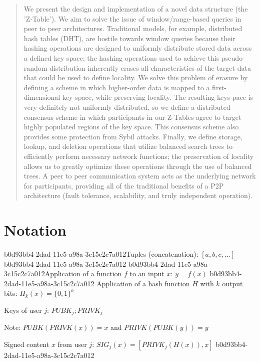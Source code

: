 \documentclass[12pt]{article}
\begin{document}
\maketitle

\begin{abstract}
We present the design and implementation of a novel data structure (the 'Z-Table'). We aim to solve the issue of window/range-based queries in peer to peer architectures. Traditional models, for example,  distributed hash tables (DHT), are hostile towards window queries because their hashing operations are designed to uniformly distribute stored data across a defined key space; the hashing operations used to achieve this pseudo-random distribution inherently erases all characteristics of the target data that could be used to define locality. We solve this problem of erasure by defining a scheme in which higher-order data is mapped to a first-dimensional key space, while preserving locality. The resulting keys pace is very definitely not uniformly distributed, so we define a distributed consensus scheme in which participants in our Z-Tables agree to target highly populated regions of the key space. This consensus scheme also provides some protection from Sybil attacks. Finally, we define storage, lookup, and deletion operations that utilize balanced search trees to efficiently perform necessary network functions; the preservation of locality allows us to greatly optimize these operations through the use of balanced trees. A peer to peer communication system acts as the underlying network for participants, providing all of the traditional benefits of a P2P architecture (fault tolerance, scalability, and truly independent operation).
\end{abstract}

\section{Notation}

b0d93bb4-2dad-11e5-a98a-3c15c2c7a012Tuples (concatenation): $[a,b,c,...]$
b0d93bb4-2dad-11e5-a98a-3c15c2c7a012
b0d93bb4-2dad-11e5-a98a-3c15c2c7a012Application of a function $f$ to an input $x$: $y=f(x)$
b0d93bb4-2dad-11e5-a98a-3c15c2c7a012
Application of a hash function $H$ with $k$ output bits: $H_{k}(x) = \{0,1\}^k$

Keys of user $j$: $ PUBK_j; PRIVK_j $

Note: $PUBK(PRIVK(x)) = x$ and $PRIVK(PUBK(y)) = y$~

Signed content $x$ from user $j$: $SIG_j(x) = \left[ PRIVK_j( H(x) ), x \right]$
b0d93bb4-2dad-11e5-a98a-3c15c2c7a012
\end{document}
